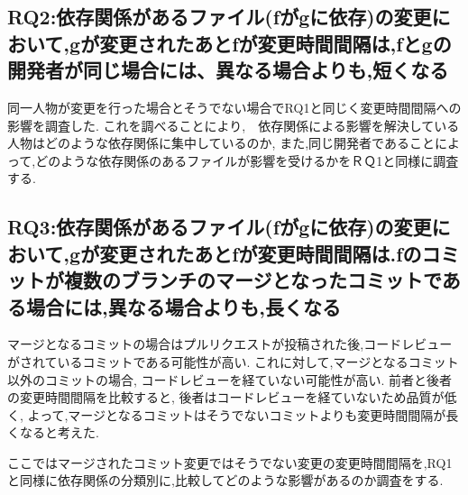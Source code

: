 \documentclass{fose2016}           %
\begin{document}
\subsection{RQ2:依存関係があるファイル(fがgに依存)の変更において,gが変更されたあとfが変更時間間隔は,fとgの開発者が同じ場合には、異なる場合よりも,短くなる}
同一人物が変更を行った場合とそうでない場合でRQ1と同じく変更時間間隔への影響を調査した.
これを調べることにより,　依存関係による影響を解決している人物はどのような依存関係に集中しているのか,
また,同じ開発者であることによって,どのような依存関係のあるファイルが影響を受けるかをＲＱ1と同様に調査する.

\subsection{RQ3:依存関係があるファイル(fがgに依存)の変更において,gが変更されたあとfが変更時間間隔は.fのコミットが複数のブランチのマージとなったコミットである場合には,異なる場合よりも,長くなる}
マージとなるコミットの場合はプルリクエストが投稿された後,コードレビューがされているコミットである可能性が高い.
これに対して,マージとなるコミット以外のコミットの場合, コードレビューを経ていない可能性が高い.
前者と後者の変更時間間隔を比較すると, 後者はコードレビューを経ていないため品質が低く,
よって,マージとなるコミットはそうでないコミットよりも変更時間間隔が長くなると考えた.

ここではマージされたコミット変更ではそうでない変更の変更時間間隔を,RQ1と同様に依存関係の分類別に,比較してどのような影響があるのか調査をする.

\end{document}
